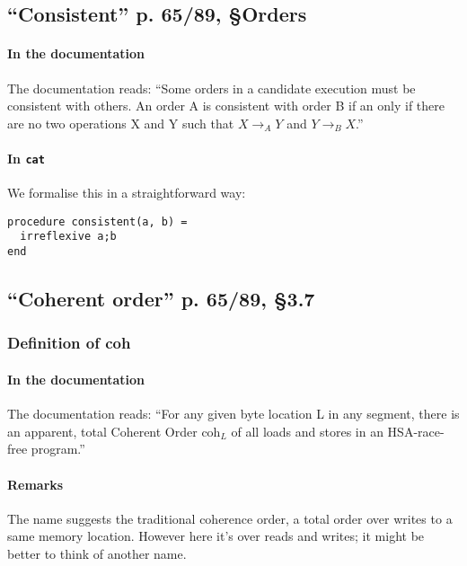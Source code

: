 \documentclass[a4paper]{article}
\begin{document}
\clearpage

\subsection{``Consistent'' p. 65/89, \S Orders}

\paragraph{In the documentation}

The documentation reads: ``Some orders in a candidate execution must be
consistent with others. An order A is consistent with order B if an only if
there are no two operations X and Y such that $X \rightarrow_A Y$  and $Y
\rightarrow_B X$.''

\paragraph{In {\tt cat}}

We formalise this in a straightforward way:
\begin{verbatim}
procedure consistent(a, b) =
  irreflexive a;b 
end
\end{verbatim}

\subsection{``Coherent order'' p. 65/89, \S 3.7}

\subsubsection{Definition of coh}

\paragraph{In the documentation}
The documentation reads: ``For any given byte location L in any segment, there
is an apparent, total Coherent Order coh$_L$ of all loads and stores in an
HSA-race-free program.'' 

\paragraph{Remarks}
The name suggests the traditional coherence order, a total order over writes to
a same memory location. However here it's over reads and writes; it might be
better to think of another name.  
\end{document}
